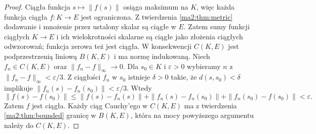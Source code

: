 \begin{proof}
Ciągła funkcja $s\mapsto\|f(s)\|$ osiąga maksimum na $K$,
więc każda funkcja ciągła $f:K\to E$ jest ograniczona.
Z twierdzenia \ref{ma2:thm:metric} dodawanie i mnożenie
przez ustalony skalar są ciągłe w $E$. Zatem sumy funkcji
ciągłych $K\to E$ i ich wielokrotności skalarne są ciągłe
jako złożenia ciągłych odwzorowań; funkcja zerowa też
jest ciągła. W konsekwencji $C(K,E)$ jest podprzestrzenią
liniową $B(K,E)$ i ma normę indukowaną. Niech $f_n\in C(K,E)$ oraz
$\|f_n-f\|_\infty\to0$. Dla $s_0\in K$ i $\varepsilon>0$
wybieramy $n$ z $\|f_n-f\|_\infty<\varepsilon/3$.
Z ciągłości $f_n$ w $s_0$ istnieje $\delta>0$ takie, że
$d(s,s_0)<\delta$ implikuje
$\|f_n(s)-f_n(s_0)\|<\varepsilon/3$.
Wtedy
\[
 \|f(s)-f(s_0)\|
 \le\|f(s)-f_n(s)\|+\|f_n(s)-f_n(s_0)\|
      +\|f_n(s_0)-f(s_0)\|<\varepsilon.
\]
Zatem $f$ jest ciągła. Każdy ciąg Cauchy'ego w $C(K,E)$
ma z twierdzenia \ref{ma2:thm:bounded} granicę w $B(K,E)$,
która na mocy powyższego argumentu należy do $C(K,E)$.
\end{proof}
